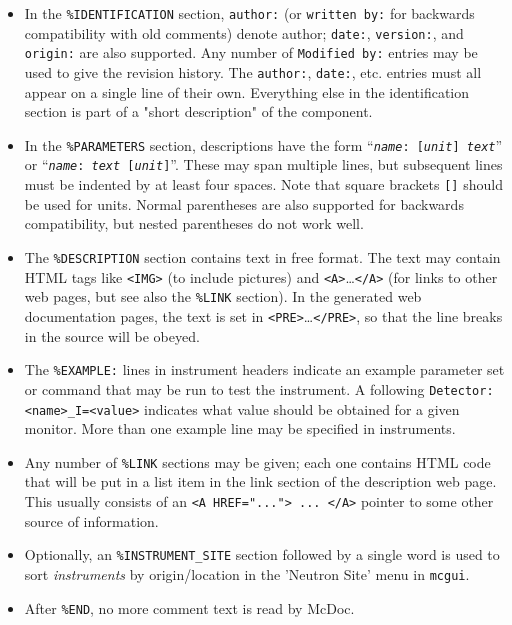 \begin{itemize}
\item In the \verb+%IDENTIFICATION+
  section, \verb+author:+ (or \verb+written by:+ for backwards
  compatibility with old comments) denote author; \verb+date:+,
  \verb+version:+, and \verb+origin:+ are also supported. Any number of
  \verb+Modified by:+ entries may be used to give the revision history.
  The \verb+author:+, \verb+date:+, etc. entries must all
  appear on a single line of their own. Everything else in the
  identification section is part of a "short description" of the
  component.
\item In the \verb+%PARAMETERS+
  section, descriptions have the form
  \hbox{``\texttt{{\it name\/}:~[{\it unit\/}] {\it text\/}}''}
  or \hbox{``\texttt{{\it name\/}:~{\it text\/} [{\it unit\/}]}''}.
  These may span multiple lines, but subsequent lines must be
  indented by at least four spaces. Note that square brackets \verb+[]+ should
  be used for units. Normal parentheses are also supported for backwards
  compatibility, but nested parentheses do not work well.
\item The \verb+%DESCRIPTION+
  section contains text in free format. The text may contain HTML tags
  like \verb+<IMG>+ (to include pictures) and
  \verb+<A>+\ldots\verb+</A>+
  (for links to other web pages, but see also the \verb+%LINK+
  section). In the generated web documentation pages, the text is set in
  \verb+<PRE>+\ldots\verb+</PRE>+, so that the line breaks in the source
  will be obeyed.
\item The \verb+%EXAMPLE:+
  lines in instrument headers indicate an example parameter set or command that may be
  run to test the instrument. A following \verb+Detector: <name>_I=<value>+
  indicates what value should be obtained for a given monitor. More than one example
  line may be specified in instruments.
\item Any number of \verb+%LINK+
  sections may be given; each one contains HTML code that will be put in
  a list item in the link section of the description web page. This
  usually consists of an \verb+<A HREF="..."> ... </A>+ pointer to some
  other source of information.
\item Optionally, an \verb+%INSTRUMENT_SITE+ section followed by a single word is used to sort \emph{instruments} by origin/location in the 'Neutron Site' menu in \verb+mcgui+.
\item After \verb+%END+, no more comment text is read by McDoc.
\end{itemize}
